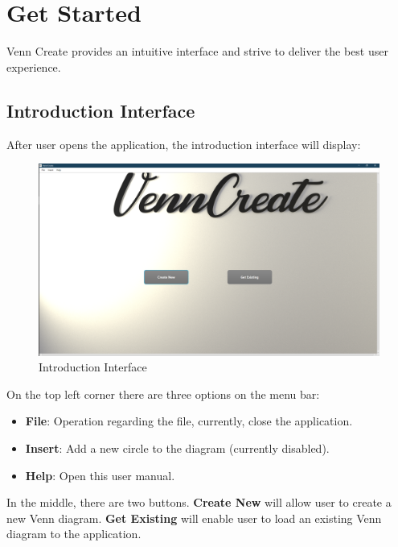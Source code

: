 \documentclass[fontsize=12pt,paper=letter,twoside]{scrartcl}
\begin{document}
\newpage
\section{Get Started}

Venn Create provides an intuitive interface and strive to deliver the best user experience.

\subsection{Introduction Interface}

 After user opens the application, the introduction interface will display:

\begin{figure}[hbt]
	\begin{mdframed}
		\includegraphics[width=\textwidth]{images/intro-screenshot.png}
	\end{mdframed}
	\caption{Introduction Interface}
\end{figure}

On the top left corner there are three options on the menu bar:

\begin{itemize}
	\item[] {
		\textbf{File}: Operation regarding the file, currently, close the application.
	}
	\item[] {
	 	\textbf{Insert}: Add a new circle to the diagram (currently disabled).
	}
	\item[] {
		\textbf{Help}: Open this user manual.
	}
\end{itemize}
	
In the middle, there are two buttons. \textbf{Create New} will allow user
to create a new Venn diagram. \textbf{Get Existing} will enable user to
load an existing Venn diagram to the application.
\end{document}

